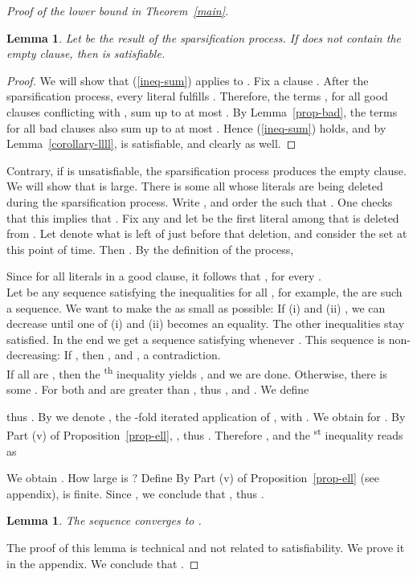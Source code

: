 \documentclass[a4paper, 11pt]{article}
\newtheorem{lemma}[theorem]{Lemma}
\begin{document}
\begin{proof}[Proof of the lower bound in Theorem~\ref{main}]
\begin{algorithm}[h]
{   \vspace{1mm}
 }
 \Return{}
\end{algorithm}


\begin{lemma}
  Let  be the result of the sparsification process. If  does
  not contain the empty clause, then  is satisfiable.
  \label{prop-F'}
\end{lemma}

\begin{proof}
  We will show that (\ref{ineq-sum}) applies to . Fix a clause . After the sparsification process, every literal 
  fulfills .  Therefore, the terms , for all good clauses  conflicting with , sum up to at
  most . By Lemma~\ref{prop-bad}, the terms  for all bad clauses  also sum up to at most
  .  Hence (\ref{ineq-sum}) holds, and by
  Lemma~\ref{corollary-llll},  is satisfiable, and clearly
   as well.  
\end{proof}

Contrary, if  is unsatisfiable, the sparsification process produces
the empty clause.  We will show that  is large. There is some  all whose literals are being deleted during the
sparsification process. Write , and
order the  such that . One checks that this implies that .  Fix any  and let
 be the first literal among  that is deleted
from . Let  denote what is left of  just before that
deletion, and consider the set  at this point of time.
Then . By the
definition of the process,
  
  
  Since  for all
  literals  in a good clause, it follows that ,
  for every .\\
  
  Let  be any sequence
  satisfying the  inequalities  for all , for example,
  the  are such a sequence. We want to make the  as
  small as possible: If (i)  and (ii)
  , we can
  decrease  until one of (i) and (ii) becomes an equality.
  The other  inequalities stay satisfied. In the end we get a
  sequence  satisfying  whenever . This
  sequence is non-decreasing: If , then
  , and , a
  contradiction. \\

  If all  are , then the \textsuperscript{th}
  inequality yields , and we are done. Otherwise,
  there is some . For
   both  and  are greater than
  , thus
  ,
  and . We define
  
  thus . By  we denote , the -fold iterated application of
  , with . We obtain  for .  By Part (v) of
  Proposition~\ref{prop-ell}, ,
  thus . Therefore , and the \textsuperscript{st} inequality reads
  as
  
  We obtain . How large is
  ? Define  By Part
  (v) of Proposition~\ref{prop-ell} (see appendix),  is finite.
  Since , we
  conclude that , thus .
  
  \begin{lemma}
    The sequence  converges to 
    .
    \label{prop-alpha}
  \end{lemma}
  
  The proof of this lemma is technical and not related to
  satisfiability. We prove it in the appendix. We conclude that .
\end{proof}
\end{document}
